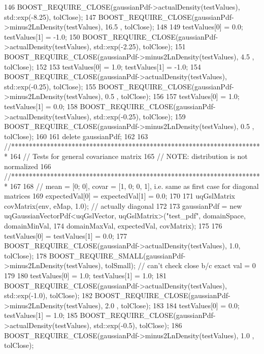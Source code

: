 \begin{DoxyCode}
146   BOOST\_REQUIRE\_CLOSE(gaussianPdf->actualDensity(testValues), std::exp(-8.25), tolClose);
147   BOOST\_REQUIRE\_CLOSE(gaussianPdf->minus2LnDensity(testValues),        16.5  , tolClose);
148 
149   testValues[0] = 0.0; testValues[1] = -1.0;
150   BOOST\_REQUIRE\_CLOSE(gaussianPdf->actualDensity(testValues), std::exp(-2.25), tolClose);
151   BOOST\_REQUIRE\_CLOSE(gaussianPdf->minus2LnDensity(testValues),         4.5  , tolClose);
152 
153   testValues[0] = 1.0; testValues[1] = -1.0;
154   BOOST\_REQUIRE\_CLOSE(gaussianPdf->actualDensity(testValues), std::exp(-0.25), tolClose);
155   BOOST\_REQUIRE\_CLOSE(gaussianPdf->minus2LnDensity(testValues),         0.5 , tolClose);
156 
157   testValues[0] = 1.0; testValues[1] = 0.0;
158   BOOST\_REQUIRE\_CLOSE(gaussianPdf->actualDensity(testValues), std::exp(-0.25), tolClose);
159   BOOST\_REQUIRE\_CLOSE(gaussianPdf->minus2LnDensity(testValues),         0.5  , tolClose);
160 
161   \textcolor{keyword}{delete} gaussianPdf;
162 
163   \textcolor{comment}{//***********************************************************************}
164   \textcolor{comment}{// Tests for general covariance matrix}
165   \textcolor{comment}{// NOTE: distribution is not normalized}
166   \textcolor{comment}{//***********************************************************************}
167   
168   \textcolor{comment}{// mean = [0; 0], covar = [1, 0; 0, 1], i.e. same as first case for diagonal matrices}
169   expectedVal[0] = expectedVal[1] = 0.0;
170 
171   uqGslMatrix covMatrix(env, eMap, 1.0);  \textcolor{comment}{// actually diagonal}
172 
173   gaussianPdf = \textcolor{keyword}{new} uqGaussianVectorPdf<uqGslVector, uqGslMatrix>(\textcolor{stringliteral}{"test\_pdf"}, domainSpace, domainMinVal, 
174                                                                                  domainMaxVal, expectedVal,
       covMatrix);
175 
176   testValues[0] = testValues[1] = 0.0;
177   BOOST\_REQUIRE\_CLOSE(gaussianPdf->actualDensity(testValues), 1.0, tolClose);
178   BOOST\_REQUIRE\_SMALL(gaussianPdf->minus2LnDensity(testValues),    tolSmall); \textcolor{comment}{// can't check close b/c
       exact val = 0}
179 
180   testValues[0] = 1.0; testValues[1] = 1.0;
181   BOOST\_REQUIRE\_CLOSE(gaussianPdf->actualDensity(testValues), std::exp(-1.0), tolClose);
182   BOOST\_REQUIRE\_CLOSE(gaussianPdf->minus2LnDensity(testValues),         2.0 , tolClose);
183 
184   testValues[0] = 0.0; testValues[1] = 1.0;
185   BOOST\_REQUIRE\_CLOSE(gaussianPdf->actualDensity(testValues), std::exp(-0.5), tolClose);
186   BOOST\_REQUIRE\_CLOSE(gaussianPdf->minus2LnDensity(testValues),         1.0 , tolClose);

\end{DoxyCode}
